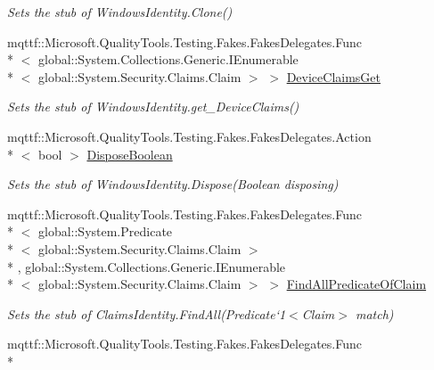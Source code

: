 \begin{DoxyCompactItemize}
\begin{DoxyCompactList}\small\item\em Sets the stub of Windows\-Identity.\-Clone()\end{DoxyCompactList}\item 
mqttf\-::\-Microsoft.\-Quality\-Tools.\-Testing.\-Fakes.\-Fakes\-Delegates.\-Func\\*
$<$ global\-::\-System.\-Collections.\-Generic.\-I\-Enumerable\\*
$<$ global\-::\-System.\-Security.\-Claims.\-Claim $>$ $>$ \hyperlink{class_system_1_1_security_1_1_principal_1_1_fakes_1_1_stub_windows_identity_a86a500a19a793982ee7402b3996a89e4}{Device\-Claims\-Get}
\begin{DoxyCompactList}\small\item\em Sets the stub of Windows\-Identity.\-get\-\_\-\-Device\-Claims()\end{DoxyCompactList}\item 
mqttf\-::\-Microsoft.\-Quality\-Tools.\-Testing.\-Fakes.\-Fakes\-Delegates.\-Action\\*
$<$ bool $>$ \hyperlink{class_system_1_1_security_1_1_principal_1_1_fakes_1_1_stub_windows_identity_a94200b1d0f6af6d5f146aca6062b6552}{Dispose\-Boolean}
\begin{DoxyCompactList}\small\item\em Sets the stub of Windows\-Identity.\-Dispose(\-Boolean disposing)\end{DoxyCompactList}\item 
mqttf\-::\-Microsoft.\-Quality\-Tools.\-Testing.\-Fakes.\-Fakes\-Delegates.\-Func\\*
$<$ global\-::\-System.\-Predicate\\*
$<$ global\-::\-System.\-Security.\-Claims.\-Claim $>$\\*
, global\-::\-System.\-Collections.\-Generic.\-I\-Enumerable\\*
$<$ global\-::\-System.\-Security.\-Claims.\-Claim $>$ $>$ \hyperlink{class_system_1_1_security_1_1_principal_1_1_fakes_1_1_stub_windows_identity_a26fbef46557a7d316a479aeaef085b69}{Find\-All\-Predicate\-Of\-Claim}
\begin{DoxyCompactList}\small\item\em Sets the stub of Claims\-Identity.\-Find\-All(Predicate`1$<$Claim$>$ match)\end{DoxyCompactList}\item 
mqttf\-::\-Microsoft.\-Quality\-Tools.\-Testing.\-Fakes.\-Fakes\-Delegates.\-Func\\*

\end{DoxyCompactItemize}
